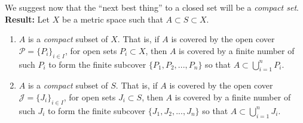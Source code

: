 \documentclass[12pt]{article}
\begin{document}
We suggest now that the ``next best thing'' to a closed set will be a {\em compact set}. \\

%
%
{\bf Result:} Let $X$ be a metric space such that $A \subset S \subset X$.

\begin{enumerate}[{Statement} 1:]
	\item $A$ is a {\em compact} subset of $X$. That is, if $A$ is covered by the open cover $\mathcal P = \{P_i\}_{i\in I}$, for open sets $P_i \subset X$, then $A$ is covered by a finite number of such $P_i$ to form the finite subcover $\{P_{1}, P_{2}, ..., P_{n} \}$ so that $A \subset \bigcup^{n}_{i = 1} P_{i}$.

	\item $A$ is a {\em compact} subset of $S$. That is, if $A$ is covered by the open cover $\mathcal J = \{J_i\}_{i\in I}$, for open sets $J_i \subset S$, then $A$ is covered by a finite number of such $J_i$ to form the finite subcover $\{J_{1}, J_{2}, ..., J_{n}\}$ so that $A \subset \bigcup^{n}_{i = 1} J_{i}$.
\end{enumerate}
\end{document}
